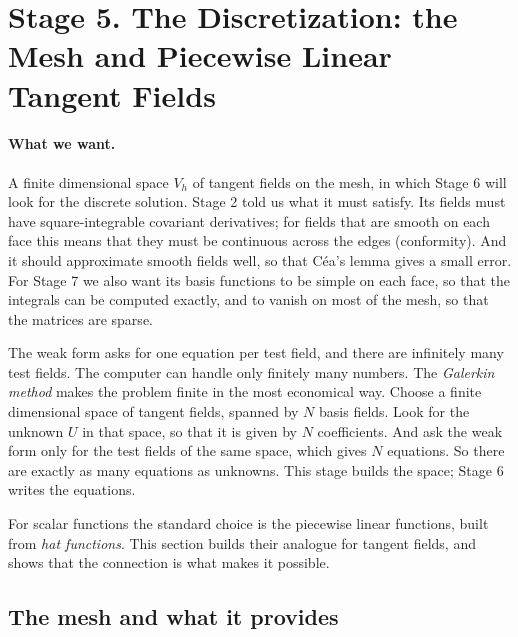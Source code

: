 \section{Stage 5. The Discretization: the Mesh and Piecewise Linear Tangent Fields}
\label{section:galerkin}

\paragraph{What we want.} A finite dimensional space $V_h$ of tangent fields on the mesh, in which Stage 6 will look for the discrete solution. Stage 2 told us what it must satisfy. Its fields must have square-integrable covariant derivatives; for fields that are smooth on each face this means that they must be continuous across the edges (conformity). And it should approximate smooth fields well, so that C\'ea's lemma gives a small error. For Stage 7 we also want its basis functions to be simple on each face, so that the integrals can be computed exactly, and to vanish on most of the mesh, so that the matrices are sparse.

The weak form asks for one equation per test field, and there are infinitely many test fields. The computer can handle only finitely many numbers. The \emph{Galerkin method} makes the problem finite in the most economical way. Choose a finite dimensional space of tangent fields, spanned by $N$ basis fields. Look for the unknown $U$ in that space, so that it is given by $N$ coefficients. And ask the weak form only for the test fields of the same space, which gives $N$ equations. So there are exactly as many equations as unknowns. This stage builds the space; Stage 6 writes the equations.

For scalar functions the standard choice is the piecewise linear functions, built from \emph{hat functions}. This section builds their analogue for tangent fields, and shows that the connection is what makes it possible.

\subsection{The mesh and what it provides}
\label{section:r1_mesh}

